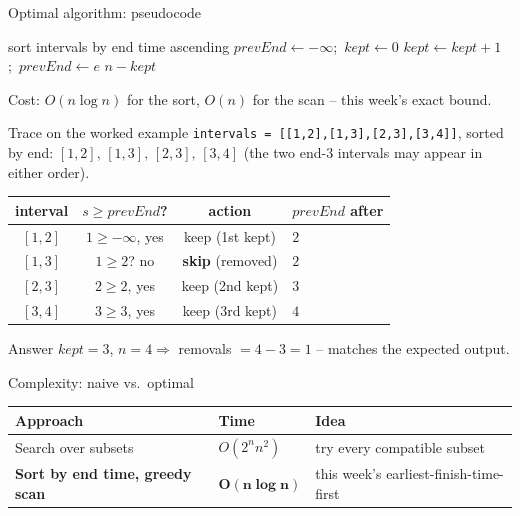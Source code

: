 \documentclass[11pt,aspectratio=169]{beamer}
\begin{document}
\begin{frame}{Optimal algorithm: pseudocode}
  \begin{algorithmic}[1]
      \State sort intervals by end time ascending
      \State $prevEnd \gets -\infty$;\ $kept \gets 0$
          \State $kept \gets kept + 1$;\ $prevEnd \gets e$ 
        \EndIf
      \EndFor
      \State \Return $n - kept$
    \EndFunction
  \end{algorithmic}
  Cost: $O(n \log n)$ for the sort, $O(n)$ for the scan -- this week's exact bound.
\end{frame}

\begin{frame}{Trace on the worked example}
  \small
  \texttt{intervals = [[1,2],[1,3],[2,3],[3,4]]}, sorted by end: $[1,2],\,[1,3],\,[2,3],\,[3,4]$
  (the two end-$3$ intervals may appear in either order).
  \begin{center}
  \begin{tabular}{@{}cccl@{}}
    \toprule
    interval & $s \ge prevEnd$? & action & $prevEnd$ after \\
    \midrule
    $[1,2]$ & $1 \ge -\infty$, yes & keep (1st kept) & $2$ \\
    $[1,3]$ & $1 \ge 2$? no & \textbf{skip} (removed) & $2$ \\
    $[2,3]$ & $2 \ge 2$, yes & keep (2nd kept) & $3$ \\
    $[3,4]$ & $3 \ge 3$, yes & keep (3rd kept) & $4$ \\
    \bottomrule
  \end{tabular}
  \end{center}
  \begin{exampleblock}{Answer}
    $kept = 3$, $n = 4 \Rightarrow$ removals $= 4 - 3 = 1$ -- matches the expected
    output.
  \end{exampleblock}
\end{frame}

\begin{frame}{Complexity: naive vs.\ optimal}
  \begin{center}
  \begin{tabular}{@{}lll@{}}
    \toprule
    Approach & Time & Idea \\
    \midrule
    Search over subsets & $O(2^n n^2)$ & try every compatible subset \\
    \textbf{Sort by end time, greedy scan} & $\boldsymbol{O(n\log n)}$ & this week's
    earliest-finish-time-first \\
    \bottomrule
  \end{tabular}
  \end{center}
\end{frame}
\end{document}
